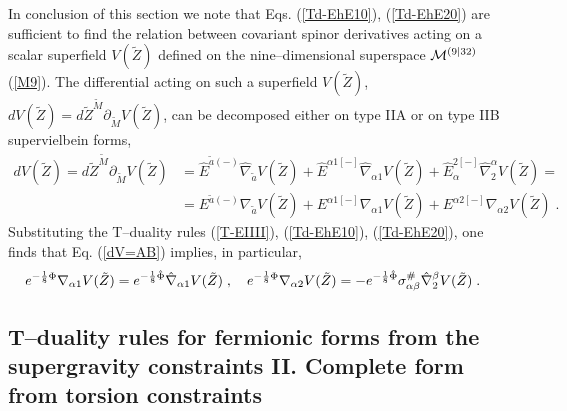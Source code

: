 \documentclass[a4paper,11pt]{article}
\begin{document}
In conclusion of this section we note that 
Eqs. (\ref{Td-EhE10}), (\ref{Td-EhE20}) are sufficient to 
find the relation between 
covariant spinor derivatives 
acting on a scalar superfield $V(\tilde{Z})$ defined on the 
nine--dimensional superspace ${\cal M}^{(9|32)}$ (\ref{M9}). 
The differential acting on such a superfield  $V(\tilde{Z})$,  
$dV(\tilde{Z}) = d\tilde{Z}^{\tilde{M}}\partial_{\tilde{M}}V(\tilde{Z})$, 
can be decomposed either on  
type IIA or  on type IIB supervielbein forms, 
\begin{eqnarray} 
\label{dV=AB}
dV(\tilde{Z}) = d\tilde{Z}^{\tilde{M}}\partial_{\tilde{M}}V(\tilde{Z}) 
& = \hat{E}^{ {\tilde{a}}(-)} 
\hat{\nabla}_{ {\tilde{a}}}V(\tilde{Z})+ 
\hat{E}^{ {\alpha}1[-]}
\hat{\nabla}_{{\alpha}1}V(\tilde{Z})+ 
\hat{E}^{2[-]}_{\alpha}
\hat{\nabla}_2^{{\alpha}}V(\tilde{Z})= 
\nonumber \\ 
& =
E^{{\tilde{a}}(-)} 
{\nabla}_{ {\tilde{a}}}V(\tilde{Z})+ 
{E}^{ {\alpha}1[-]} 
{\nabla}_{{\alpha}1}V(\tilde{Z}) + 
{E}^{ {\alpha}2[-]} 
{\nabla}_{{\alpha}2}V(\tilde{Z})
\; . \qquad 
\end{eqnarray}
Substituting the T--duality rules (\ref{T-EIIII}), 
(\ref{Td-EhE10}), (\ref{Td-EhE20}), 
one finds that 
Eq. (\ref{dV=AB}) implies, in particular, 
\begin{eqnarray} 
\label{dfV=AB}
& e^{- {1 \over 8}\Phi} {\nabla}_{{\alpha}1}V(\tilde{Z}) = 
e^{- {1 \over 8}\hat{\Phi}} \hat{\nabla}_{{\alpha}1}V(\tilde{Z})\; , 
\quad 
e^{- {1 \over 8}\Phi}  
{\nabla}_{{\alpha}2}V(\tilde{Z}) = - e^{- {1 \over 8}\hat{\Phi}} 
\sigma^{ {\#}}_{ {\alpha} {\beta}}
\hat{\nabla}_2^{ {\beta}}V(\tilde{Z})\; . 
\end{eqnarray}



\subsection{T--duality rules for fermionic forms from 
the supergravity constraints II. 
Complete form from torsion constraints}
\end{document}
